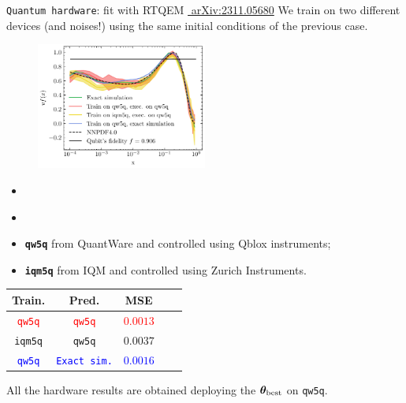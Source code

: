 \documentclass[8pt, xcolor={svgnames}, hyperref={linkcolor=black}, aspectratio=169]{beamer}
\begin{document}
\begin{frame}{\texttt{Quantum hardware}: fit with RTQEM \hfill \href{https://arxiv.org/abs/2311.05680}{\faBook\,\,arXiv:2311.05680}}
We train on two different devices (and noises!) using the same initial
conditions of the previous case.
\begin{multicols}{2}

\begin{figure}
    \includegraphics[width=0.5\textwidth]{figures/100.pdf}%
\end{figure}

\begin{center}
\begin{itemize}[noitemsep]
    \item \texttt{\\}
    \item \texttt{\\}
    \item[\faCog] \textbf{\texttt{qw5q}} from QuantWare and controlled using Qblox instruments;
    \item[\faCog] \textbf{\texttt{iqm5q}} from IQM and controlled using Zurich Instruments.
\end{itemize}
\begin{table}
\begin{tabular}{ccccc}
\hline \hline 
\textbf{Train.} & \textbf{Pred.} & MSE \\
\hline 
\textcolor{red}{\texttt{qw5q}} & \textcolor{red}{\texttt{qw5q}} & \textcolor{red}{$0.0013$}  \\     
\textcolor{chromeyellow}{\texttt{iqm5q}} & \textcolor{chromeyellow}{\texttt{qw5q}} & \textcolor{chromeyellow}{$0.0037$} \\   
\textcolor{blue}{\texttt{qw5q}} & \textcolor{blue}{\texttt{Exact sim.}} & \textcolor{blue}{$0.0016$} \\   
\hline \hline
\end{tabular}
\centering
\end{table}
\end{center}
\end{multicols}
\begin{center}
All the hardware results are obtained deploying the $\bm{\theta}_{\rm best}$ on 
\texttt{qw5q}.
\end{center}
\end{frame}
\end{document}
